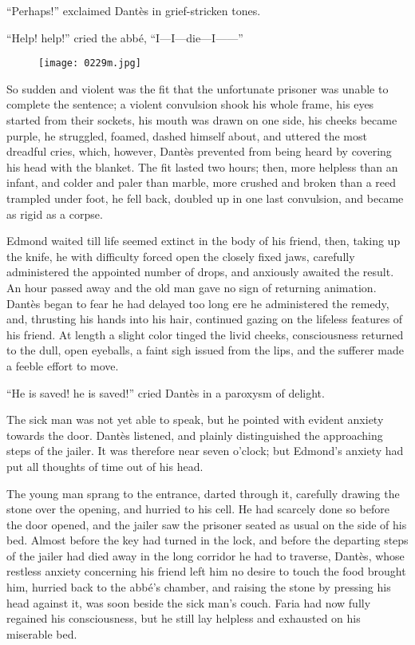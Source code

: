 “Perhaps!” exclaimed Dantès in grief-stricken tones.

“Help! help!” cried the abbé, “I—I—die—I——”

\begin{figure}[h]
\texttt{[image: 0229m.jpg]}
\end{figure}

So sudden and violent was the fit that the unfortunate prisoner was
unable to complete the sentence; a violent convulsion shook his whole
frame, his eyes started from their sockets, his mouth was drawn on one
side, his cheeks became purple, he struggled, foamed, dashed himself
about, and uttered the most dreadful cries, which, however, Dantès
prevented from being heard by covering his head with the blanket. The
fit lasted two hours; then, more helpless than an infant, and colder
and paler than marble, more crushed and broken than a reed trampled
under foot, he fell back, doubled up in one last convulsion, and became
as rigid as a corpse.

Edmond waited till life seemed extinct in the body of his friend, then,
taking up the knife, he with difficulty forced open the closely fixed
jaws, carefully administered the appointed number of drops, and
anxiously awaited the result. An hour passed away and the old man gave
no sign of returning animation. Dantès began to fear he had delayed too
long ere he administered the remedy, and, thrusting his hands into his
hair, continued gazing on the lifeless features of his friend. At
length a slight color tinged the livid cheeks, consciousness returned
to the dull, open eyeballs, a faint sigh issued from the lips, and the
sufferer made a feeble effort to move.

“He is saved! he is saved!” cried Dantès in a paroxysm of delight.

The sick man was not yet able to speak, but he pointed with evident
anxiety towards the door. Dantès listened, and plainly distinguished
the approaching steps of the jailer. It was therefore near seven
o’clock; but Edmond’s anxiety had put all thoughts of time out of his
head.

The young man sprang to the entrance, darted through it, carefully
drawing the stone over the opening, and hurried to his cell. He had
scarcely done so before the door opened, and the jailer saw the
prisoner seated as usual on the side of his bed. Almost before the key
had turned in the lock, and before the departing steps of the jailer
had died away in the long corridor he had to traverse, Dantès, whose
restless anxiety concerning his friend left him no desire to touch the
food brought him, hurried back to the abbé’s chamber, and raising the
stone by pressing his head against it, was soon beside the sick man’s
couch. Faria had now fully regained his consciousness, but he still lay
helpless and exhausted on his miserable bed.

